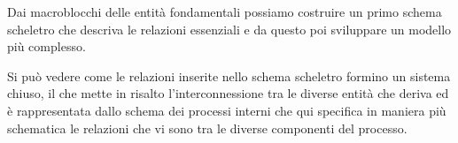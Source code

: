 Dai macroblocchi delle entità fondamentali possiamo costruire un primo schema scheletro che descriva le relazioni essenziali e da questo poi sviluppare un modello più complesso.\newline



\noindent{}
\newline\newline
Si può vedere come le relazioni inserite nello schema scheletro formino un sistema chiuso, il che mette in risalto l'interconnessione tra le diverse entità che deriva ed è rappresentata dallo schema dei processi interni che qui specifica in maniera più schematica le relazioni che vi sono tra le diverse componenti del processo.